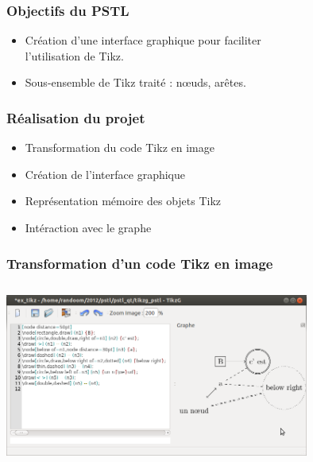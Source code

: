 \documentclass{beamer}
\begin{document}
\begin{frame}
\frametitle{Objectifs du PSTL} 


\begin{itemize}

\item Création d'une interface graphique pour
faciliter\\ l'utilisation de Tikz.

\item Sous-ensemble de Tikz traité : nœuds,
arêtes.

\end{itemize}
\end{frame}

\begin{frame}
\frametitle{Réalisation du projet} 


\begin{itemize}

 \item Transformation du code Tikz en image

\pause \item Création de l'interface graphique

\pause \item Représentation mémoire des objets Tikz

\pause \item Intéraction avec le graphe

\end{itemize}

\end{frame}

\begin{frame}
\frametitle{Transformation d'un code Tikz en image}
\centering
\includegraphics[width=10cm, height=6cm]{img/r_1.png}
\end{frame}
\end{document}
